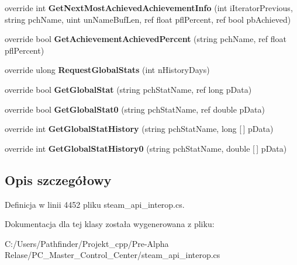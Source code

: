 \begin{DoxyCompactItemize}
override int {\bfseries Get\+Next\+Most\+Achieved\+Achievement\+Info} (int i\+Iterator\+Previous, string pch\+Name, uint un\+Name\+Buf\+Len, ref float pfl\+Percent, ref bool pb\+Achieved)
\item 
\mbox{\label{class_valve_1_1_steamworks_1_1_c_steam_user_stats_a836e5fc6d81b518a6643ef4946b28cf3}} 
override bool {\bfseries Get\+Achievement\+Achieved\+Percent} (string pch\+Name, ref float pfl\+Percent)
\item 
\mbox{\label{class_valve_1_1_steamworks_1_1_c_steam_user_stats_a1a08bec027eff94a497bae2ec01fd83c}} 
override ulong {\bfseries Request\+Global\+Stats} (int n\+History\+Days)
\item 
\mbox{\label{class_valve_1_1_steamworks_1_1_c_steam_user_stats_ab8123047f90f77e9282ac82c66b7dd6b}} 
override bool {\bfseries Get\+Global\+Stat} (string pch\+Stat\+Name, ref long p\+Data)
\item 
\mbox{\label{class_valve_1_1_steamworks_1_1_c_steam_user_stats_a4c748c8709abb8701a5c1cdb6210d783}} 
override bool {\bfseries Get\+Global\+Stat0} (string pch\+Stat\+Name, ref double p\+Data)
\item 
\mbox{\label{class_valve_1_1_steamworks_1_1_c_steam_user_stats_a3e8b14222d9aa55f9870d36723204fa1}} 
override int {\bfseries Get\+Global\+Stat\+History} (string pch\+Stat\+Name, long \mbox{[}$\,$\mbox{]} p\+Data)
\item 
\mbox{\label{class_valve_1_1_steamworks_1_1_c_steam_user_stats_a6c201eb3e1b000fb374867c6aa45294d}} 
override int {\bfseries Get\+Global\+Stat\+History0} (string pch\+Stat\+Name, double \mbox{[}$\,$\mbox{]} p\+Data)
\end{DoxyCompactItemize}


\subsection{Opis szczegółowy}


Definicja w linii 4452 pliku steam\+\_\+api\+\_\+interop.\+cs.



Dokumentacja dla tej klasy została wygenerowana z pliku\+:\begin{DoxyCompactItemize}
\item 
C\+:/\+Users/\+Pathfinder/\+Projekt\+\_\+cpp/\+Pre-\/\+Alpha Relase/\+P\+C\+\_\+\+Master\+\_\+\+Control\+\_\+\+Center/steam\+\_\+api\+\_\+interop.\+cs\end{DoxyCompactItemize}
